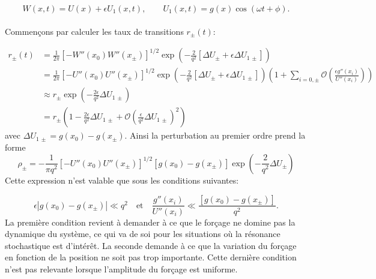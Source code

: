 \begin{equation}\label{potentiel_perturbatif}
	W(x,t) = U(x) + \epsilon U_1(x,t), \qquad U_1(x,t) = g(x)\cos(\omega t + \phi).
\end{equation}

\paragraph{} Commençons par calculer les taux de transitions $r_\pm(t)$:

\begin{equation}\label{dev_taux_transitions}
\begin{split}
	r_\pm(t) &= \frac{1}{2\pi} [-W''(x_0)W''(x_\pm)]^{1/2} \exp\left( -\frac{2}{q^2} [\Delta U_\pm + \epsilon \Delta U_{1\,\pm}] \right)\\
	&= \frac{1}{2\pi} [-U''(x_0)U''(x_\pm)]^{1/2} \exp\left( -\frac{2}{q^2} [\Delta U_\pm + \epsilon \Delta U_{1\,\pm}] \right) \left( 1 + \sum_{i=0,\pm} \mathcal O\left( \frac{\epsilon g''(x_i)}{U''(x_i)} \right)  \right)  \\
	&\approx r_\pm \exp\left( -\frac{2\epsilon}{q^2} \Delta U_{1\,\pm} \right)\\
	&= r_\pm \left( 1 - \frac{2\epsilon}{q^2} \Delta U_{1\,\pm} + \mathcal O\left( \frac{\epsilon}{q^2} \Delta U_{1\,\pm} \right)^2 \right) 
\end{split}
\end{equation}
avec $\Delta U_{1\,\pm} = g(x_0)-g(x_\pm)$. Ainsi la perturbation au premier ordre prend la forme
\begin{equation}\label{rho_pm}
	\rho_\pm = - \frac{1}{\pi q^2} [-U''(x_0)U''(x_\pm)]^{1/2} [g(x_0)-g(x_\pm)] \exp\left( - \frac{2}{q^2} \Delta U_\pm \right) 
\end{equation}
Cette expression n'est valable que %
sous les conditions suivantes:

\begin{equation}\label{conditions_validite_perturbation}
	\epsilon |g(x_0)-g(x_\pm)| \ll q^2 \quad \text{et} \quad \frac{g''(x_i)}{U''(x_i)} \ll \frac{[g(x_0)-g(x_\pm)]}{q^2}.
\end{equation}
La première condition revient à demander à ce que le forçage ne domine pas la dynamique du système, ce qui va de soi pour les situations où la résonance stochastique est d'intérêt. La seconde demande à ce que la variation du forçage en fonction de la position ne soit pas trop importante. Cette dernière condition n'est pas relevante lorsque l'amplitude du forçage est uniforme.

